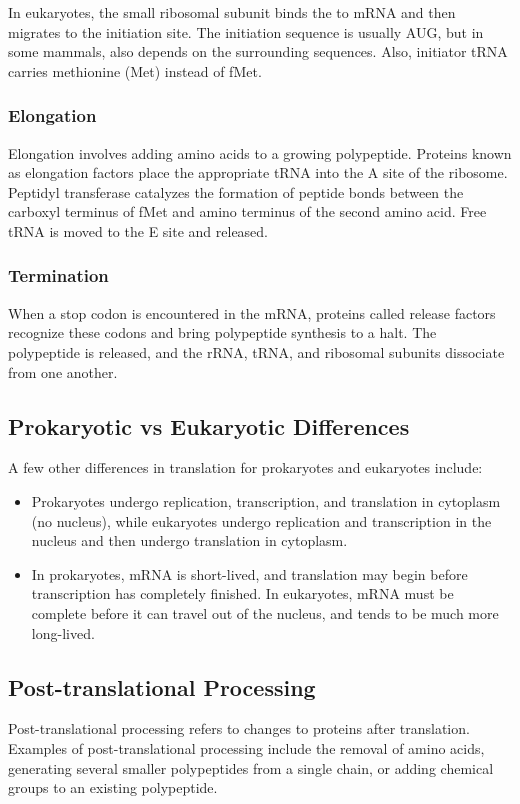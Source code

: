 \documentclass[12pt,titlepage]{article}
\begin{document}
        In eukaryotes, the small ribosomal subunit binds the to mRNA and then migrates to the initiation site. The initiation sequence is usually AUG, but in some
        mammals, also depends on the surrounding sequences. Also, initiator tRNA carries methionine (Met) instead of fMet.

      \subsubsection{Elongation}
        Elongation involves adding amino acids to a growing polypeptide. Proteins known as elongation factors place the appropriate tRNA into the A site of the
        ribosome. Peptidyl transferase catalyzes the formation of peptide bonds between the carboxyl terminus of fMet and amino terminus of the second amino acid.
        Free tRNA is moved to the E site and released.

      \subsubsection{Termination}
        When a stop codon is encountered in the mRNA, proteins called release factors recognize these codons and bring polypeptide synthesis to a halt. The
        polypeptide is released, and the rRNA, tRNA, and ribosomal subunits dissociate from one another.

    \subsection{Prokaryotic vs Eukaryotic Differences}
      A few other differences in translation for prokaryotes and eukaryotes include:
      \begin{itemize}
        \item Prokaryotes undergo replication, transcription, and translation in cytoplasm (no nucleus), while eukaryotes undergo replication and transcription in
          the nucleus and then undergo translation in cytoplasm.
        \item In prokaryotes, mRNA is short-lived, and translation may begin before transcription has completely finished. In eukaryotes, mRNA must be complete
          before it can travel out of the nucleus, and tends to be much more long-lived.
      \end{itemize}

    \subsection{Post-translational Processing}
      Post-translational processing refers to changes to proteins after translation. Examples of post-translational processing include the removal of amino acids,
      generating several smaller polypeptides from a single chain, or adding chemical groups to an existing polypeptide.
\end{document}
